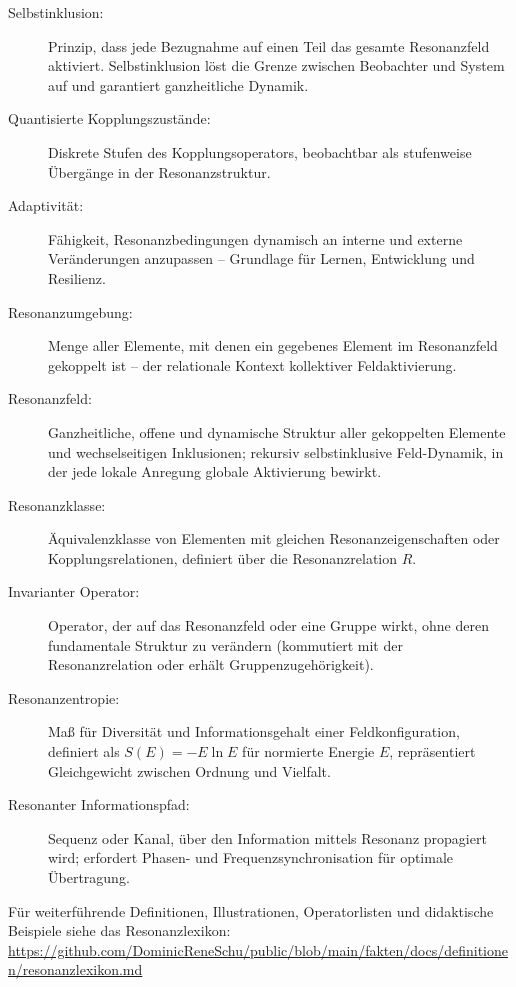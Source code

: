 \documentclass[12pt]{iopart}
\begin{document}
\begin{description}
	\item[Selbstinklusion:]  
	Prinzip, dass jede Bezugnahme auf einen Teil das gesamte Resonanzfeld aktiviert. Selbstinklusion löst die Grenze zwischen Beobachter und System auf und garantiert ganzheitliche Dynamik.
	
	\item[Quantisierte Kopplungszustände:]  
	Diskrete Stufen des Kopplungsoperators, beobachtbar als stufenweise Übergänge in der Resonanzstruktur.
	
	\item[Adaptivität:]  
	Fähigkeit, Resonanzbedingungen dynamisch an interne und externe Veränderungen anzupassen – Grundlage für Lernen, Entwicklung und Resilienz.
	
	\item[Resonanzumgebung:]  
	Menge aller Elemente, mit denen ein gegebenes Element im Resonanzfeld gekoppelt ist – der relationale Kontext kollektiver Feldaktivierung.
	
	\item[Resonanzfeld:]  
	Ganzheitliche, offene und dynamische Struktur aller gekoppelten Elemente und wechselseitigen Inklusionen; rekursiv selbstinklusive Feld-Dynamik, in der jede lokale Anregung globale Aktivierung bewirkt.
	
	\item[Resonanzklasse:]  
	Äquivalenzklasse von Elementen mit gleichen Resonanzeigenschaften oder Kopplungsrelationen, definiert über die Resonanzrelation $R$.
	
	\item[Invarianter Operator:]  
	Operator, der auf das Resonanzfeld oder eine Gruppe wirkt, ohne deren fundamentale Struktur zu verändern (kommutiert mit der Resonanzrelation oder erhält Gruppenzugehörigkeit).
	
	\item[Resonanzentropie:]  
	Maß für Diversität und Informationsgehalt einer Feldkonfiguration, definiert als $S(E) = -E \ln E$ für normierte Energie $E$, repräsentiert Gleichgewicht zwischen Ordnung und Vielfalt.
	
	\item[Resonanter Informationspfad:]  
	Sequenz oder Kanal, über den Information mittels Resonanz propagiert wird; erfordert Phasen- und Frequenzsynchronisation für optimale Übertragung.
	
\end{description}

\noindent
Für weiterführende Definitionen, Illustrationen, Operatorlisten und didaktische Beispiele siehe das Resonanzlexikon:\\
\url{https://github.com/DominicReneSchu/public/blob/main/fakten/docs/definitionen/resonanzlexikon.md}
\newpage
\end{document}
